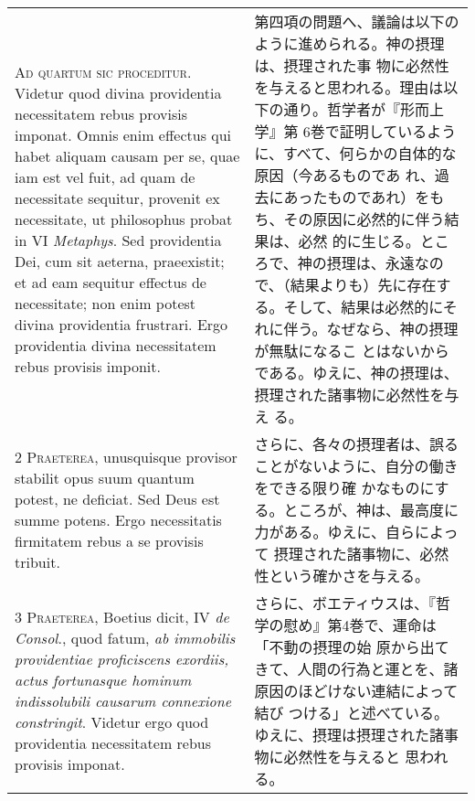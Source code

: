 \documentclass[10pt]{jsarticle} %
\begin{document}
\begin{longtable}{p{21em}p{21em}}


{\Huge A}{\scshape d quartum sic proceditur}. Videtur quod
divina providentia necessitatem rebus provisis imponat. Omnis enim
effectus qui habet aliquam causam per se, quae iam est vel fuit, ad quam
de necessitate sequitur, provenit ex necessitate, ut philosophus probat
in VI {\itshape Metaphys}. Sed providentia Dei, cum sit aeterna, praeexistit; et ad
eam sequitur effectus de necessitate; non enim potest divina providentia
frustrari. Ergo providentia divina necessitatem rebus provisis imponit.

&

第四項の問題へ、議論は以下のように進められる。神の摂理は、摂理された事
物に必然性を与えると思われる。理由は以下の通り。哲学者が『形而上学』第
6巻で証明しているように、すべて、何らかの自体的な原因（今あるものであ
れ、過去にあったものであれ）をもち、その原因に必然的に伴う結果は、必然
的に生じる。ところで、神の摂理は、永遠なので、（結果よりも）先に存在す
る。そして、結果は必然的にそれに伴う。なぜなら、神の摂理が無駄になるこ
とはないからである。ゆえに、神の摂理は、摂理された諸事物に必然性を与え
る。


\\


2 {\scshape Praeterea}, unusquisque provisor stabilit
opus suum quantum potest, ne deficiat. Sed Deus est summe potens. Ergo
necessitatis firmitatem rebus a se provisis tribuit.

&

さらに、各々の摂理者は、誤ることがないように、自分の働きをできる限り確
かなものにする。ところが、神は、最高度に力がある。ゆえに、自らによって
摂理された諸事物に、必然性という確かさを与える。


\\


3 {\scshape Praeterea}, Boetius dicit, IV {\itshape de Consol}.,
quod fatum, {\itshape ab immobilis providentiae proficiscens exordiis, actus
fortunasque hominum indissolubili causarum connexione
constringit}. Videtur ergo quod providentia necessitatem rebus provisis
imponat.

&

さらに、ボエティウスは、『哲学の慰め』第4巻で、運命は「不動の摂理の始
原から出てきて、人間の行為と運とを、諸原因のほどけない連結によって結び
つける」と述べている。ゆえに、摂理は摂理された諸事物に必然性を与えると
思われる。

\\



\end{longtable}
\end{document}
